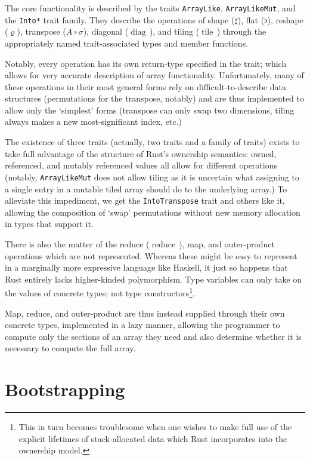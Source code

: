 \documentclass{DIKU-report-variant}
\newcommand\mrm[1]{\mathrm{#1}}
\newcommand\brm[1]{\bm{\mrm{#1}}}
\newcommand\reduce{\operatorname*{\brm{reduce}\,}}
\newcommand\diag{\operatorname*{\brm{diag}\,}}
\newcommand\tile{\operatorname*{\brm{tile}\,}}
\begin{document}
The core functionality is described by the traits \texttt{ArrayLike}, \texttt{ArrayLikeMut}, and
the \texttt{Into*} trait family. They describe the operations of shape (\(\sharp\)), flat (\(\flat\)),
reshape (\(\varrho\)), transpose (\(A \circ \sigma\)), diagonal (\(\diag\)), and tiling (\(\tile\))
through the appropriately named trait-associated types and member functions.

Notably, every operation has its own return-type specified in the trait; which allows for very accurate
description of array functionality. Unfortunately, many of these operations in their most general forms
rely on difficult-to-describe data structures (permutations for the transpose, notably) and are thus
implemented to allow only the `simplest' forms (transpose can only swap two dimensions, tiling always
makes a new most-significant index, etc.)

The existence of three traits (actually, two traits and a family of traits) exists to take full advantage
of the structure of Rust's ownership semantics: owned, referenced, and mutably referenced values all
allow for different operations (notably, \texttt{ArrayLikeMut} does not allow tiling as it is uncertain what
assigning to a single entry in a mutable tiled array should do to the underlying array.) To alleviate
this impediment, we get the \texttt{IntoTranspose} trait and others like it, allowing the composition
of `swap' permutations without new memory allocation in types that support it.

There is also the matter of the reduce (\(\reduce\)), map, and outer-product operations which are not
represented. Whereas these might be easy to represent in a marginally more expressive language like
Haskell, it just so happens that Rust entirely lacks higher-kinded polymorphism. Type variables can
only take on the values of concrete types; not type constructors\footnote{This in turn becomes troublesome
when one wishes to make full use of the explicit lifetimes of stack-allocated data which Rust incorporates
into the ownership model.}.

Map, reduce, and outer-product are thus instead supplied through their own concrete types, implemented
in a lazy manner, allowing the programmer to compute only the sections of an array they need and also
determine whether it is necessary to compute the full array.

\section{Bootstrapping}
\end{document}
